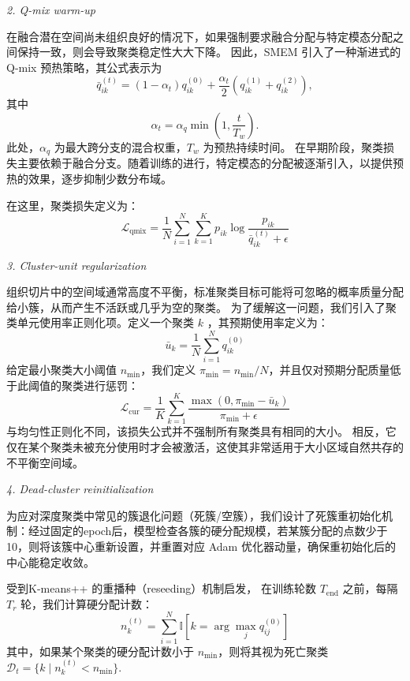 \documentclass[journal]{IEEEtran}
\begin{document}
\textit{2. Q-mix warm-up}

在融合潜在空间尚未组织良好的情况下，如果强制要求融合分配与特定模态分配之间保持一致，则会导致聚类稳定性大大下降。
因此，SMEM 引入了一种渐进式的 Q-mix 预热策略，其公式表示为
\begin{equation}
    \bar{q}_{ik}^{(t)}
=
(1-\alpha_t)q_{ik}^{(0)}
+
\frac{\alpha_t}{2}
\left(q_{ik}^{(1)}+q_{ik}^{(2)}\right),
\end{equation}
其中
\begin{equation}
\alpha_t
=
\alpha_q
\min\left(1,\frac{t}{T_w}\right).
\end{equation}
此处，$\alpha_q$ 为最大跨分支的混合权重，$T_w$ 为预热持续时间。
在早期阶段，聚类损失主要依赖于融合分支。随着训练的进行，特定模态的分配被逐渐引入，以提供预热的效果，逐步抑制少数分布域。

在这里，聚类损失定义为：
\begin{equation}
\mathcal{L}_{\mathrm{qmix}}
=
\frac{1}{N}
\sum_{i=1}^{N}\sum_{k=1}^{K}
p_{ik}
\log
\frac{p_{ik}}{\bar{q}_{ik}^{(t)}+\epsilon}
\end{equation}

\textit{3. Cluster-unit regularization}

组织切片中的空间域通常高度不平衡，标准聚类目标可能将可忽略的概率质量分配给小簇，从而产生不活跃或几乎为空的聚类。
为了缓解这一问题，我们引入了聚类单元使用率正则化项。定义一个聚类 $k$ ，其预期使用率定义为：
\begin{equation}
    \bar{u}_k
=
\frac{1}{N}
\sum_{i=1}^{N}
q_{ik}^{(0)}
\end{equation}
给定最小聚类大小阈值 $n_{\min}$，我们定义 $\pi_{\min}=n_{\min}/N$，并且仅对预期分配质量低于此阈值的聚类进行惩罚：
\begin{equation}
    \mathcal{L}_{\mathrm{cur}}
=
\frac{1}{K}
\sum_{k=1}^{K}
\frac{
\max(0,\pi_{\min}-\bar{u}_k)
}{
\pi_{\min}+\epsilon
}
\end{equation}
与均匀性正则化不同，该损失公式并不强制所有聚类具有相同的大小。
相反，它仅在某个聚类未被充分使用时才会被激活，这使其非常适用于大小区域自然共存的不平衡空间域。

\textit{4. Dead-cluster reinitialization}

为应对深度聚类中常见的簇退化问题（死簇/空簇），我们设计了死簇重初始化机制：经过固定的epoch后，模型检查各簇的硬分配规模，若某簇分配的点数少于 10，则将该簇中心重新设置，并重置对应 Adam 优化器动量，确保重初始化后的中心能稳定收敛。
 
受到K-means++ 的重播种（reseeding）机制启发，
在训练轮数 $T_{\mathrm{end}}$ 之前，每隔 $T_r$ 轮，我们计算硬分配计数：
\begin{equation}
    n_k^{(t)}
=
\sum_{i=1}^{N}
\mathbb{I}
\left[
k=\arg\max_{j}q_{ij}^{(0)}
\right]
\end{equation}
其中，如果某个聚类的硬分配计数小于 $n_{\min}$，则将其视为死亡聚类$\mathcal{D}_t
=
\{k\mid n_k^{(t)}<n_{\min}\}.$
\end{document}
